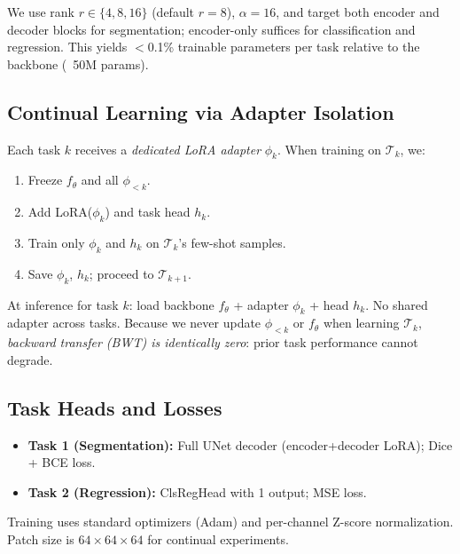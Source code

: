 We use rank $r \in \{4, 8, 16\}$ (default $r=8$), $\alpha=16$, and target both encoder and decoder blocks for segmentation; encoder-only suffices for classification and regression. This yields $<$0.1\% trainable parameters per task relative to the backbone (~50M params).

\subsection{Continual Learning via Adapter Isolation}
\label{sec:continual}

Each task $k$ receives a \emph{dedicated LoRA adapter} $\phi_k$. When training on $\mathcal{T}_k$, we:
\begin{enumerate}
\item Freeze $f_\theta$ and all $\phi_{<k}$.
\item Add LoRA($\phi_k$) and task head $h_k$.
\item Train only $\phi_k$ and $h_k$ on $\mathcal{T}_k$'s few-shot samples.
\item Save $\phi_k$, $h_k$; proceed to $\mathcal{T}_{k+1}$.
\end{enumerate}

At inference for task $k$: load backbone $f_\theta$ + adapter $\phi_k$ + head $h_k$. No shared adapter across tasks. Because we never update $\phi_{<k}$ or $f_\theta$ when learning $\mathcal{T}_k$, \emph{backward transfer (BWT) is identically zero}: prior task performance cannot degrade.

\subsection{Task Heads and Losses}
\label{sec:heads}

\begin{itemize}
\item \textbf{Task 1 (Segmentation):} Full UNet decoder (encoder+decoder LoRA); Dice + BCE loss.
\item \textbf{Task 2 (Regression):} ClsRegHead with 1 output; MSE loss.
\end{itemize}

Training uses standard optimizers (Adam) and per-channel Z-score normalization. Patch size is $64\times64\times64$ for continual experiments.
